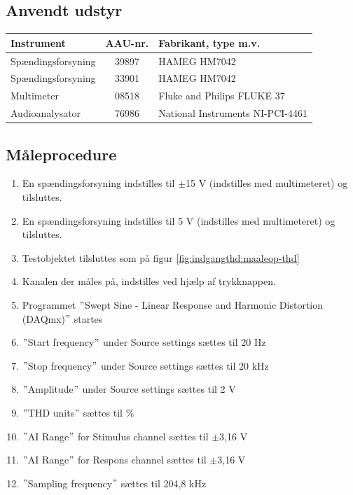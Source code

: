 \subsection*{Anvendt udstyr}

\begin{table}[h]
\centering
\begin{tabular}{l|c|l}
\hline\hline
Instrument & AAU-nr. & Fabrikant, type m.v. \\
\hline\hline
Spændingsforsyning & 39897 & HAMEG HM7042 \\[4pt]
Spændingsforsyning & 33901 & HAMEG HM7042 \\[4pt]
Multimeter & 08518 & Fluke and Philips FLUKE 37 \\[4pt]
Audioanalysator & 76986 & National Instruments NI-PCI-4461 \\
\hline\hline
\end{tabular}
\label{tab:indgang:maaleudstyr_forforstaerker}
\end{table}

\subsection*{Måleprocedure}
\begin{enumerate}
\item En spændingsforsyning indstilles til $\pm$15 V (indstilles med multimeteret) og tilsluttes.
\item En spændingsforsyning indstilles til 5 V (indstilles med multimeteret) og tilsluttes.
\item Testobjektet tilsluttes som på figur \ref{fig:indgangthd:maaleop-thd}
\item Kanalen der måles på, indstilles ved hjælp af trykknappen.
\item Programmet $"$Swept Sine - Linear Response and Harmonic Distortion (DAQmx)$"$ startes
\item $"$Start frequency$"$ under Source settings sættes til 20 Hz
\item $"$Stop frequency$"$ under Source settings sættes til 20 kHz
\item $"$Amplitude$"$ under Source settings sættes til 2 V
\item $"$THD units$"$ sættes til \%
\item $"$AI Range$"$ for Stimulus channel sættes til $\pm$3,16 V
\item $"$AI Range$"$ for Respons channel sættes til $\pm$3,16 V
\item $"$Sampling frequency$"$ sættes til 204,8 kHz
\end{enumerate}


